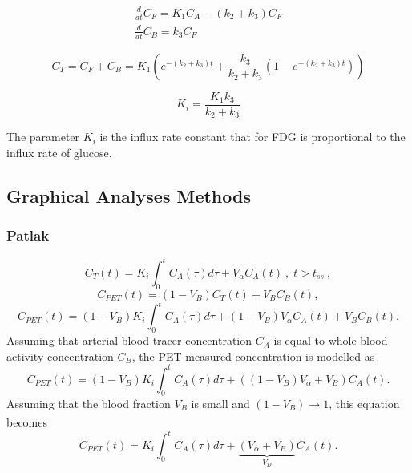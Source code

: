 \begin{subequations}
\begin{align}
\frac{d}{dt}C_F = K_1 C_A - (k_2 + k_3)C_F \\ 
\frac{d}{dt}C_B = k_3 C_F  
\end{align}
\label{eqn:2TCM_Diff_k4=0}
\end{subequations}

\begin{equation}
C_T =  C_F + C_B = K_1 ( e^{-(k_2+k_3)t} + \frac{k_3}{k_2+k_3}(1-e^{-(k_2+k_3)t}))   
\label{eqn:2TCM}
\end{equation}

\begin{equation}
K_i = \frac{K_1 k_3}{k_2+k_3}
\label{eqn:FDG_Ki}
\end{equation}

The parameter $K_i$ is the influx rate constant that for FDG is proportional to the influx rate of glucose. 

\subsection{Graphical Analyses Methods}

\subsubsection{Patlak}
\begin{equation}
{C_{T}}(t) = {K_i} \int_{0}^{t} C_{A}(\tau) d\tau +  {V_{\alpha}} C_{A}(t) \ , \;  t>t_{ss} \ ,
\end{equation}
%
\begin{equation} 
{C_{PET}}(t)  = (1-V_{B}){C_{T}}(t) + V_{B}C_{B}(t),
\end{equation}
%
%
\begin{equation} 
{C_{PET}}(t)  = (1-V_{B}){K_i} \int_{0}^{t} C_{A}(\tau) d\tau +  (1-V_{B}) {V_{\alpha}} C_{A}(t) + V_{B}C_{B}(t).
\end{equation}
Assuming that arterial blood tracer concentration $C_{A}$ is equal to whole blood activity concentration $C_{B}$, the PET measured concentration is modelled as
\begin{equation} 
{C_{PET}}(t)  = (1-V_{B}){K_i} \int_{0}^{t} C_{A}(\tau) d\tau +  ((1-V_{B}) {V_{\alpha}}+ V_{B})C_{A}(t).
\end{equation}
Assuming that the blood fraction $V_B$ is small and $(1-V_B) \xrightarrow[]{}1$, this equation becomes
%
%
\begin{equation} 
{C_{PET}}(t)  = {K_i} \int_{0}^{t} C_{A}(\tau) d\tau +  \underbrace{({V_{\alpha}}+ V_{B})}_{V_D} C_{A}(t).
\end{equation}
%
%
%

